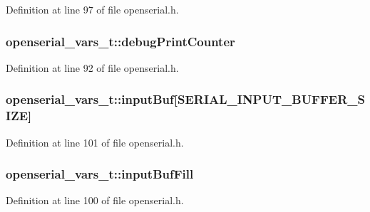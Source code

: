 Definition at line 97 of file openserial.\+h.

\subsubsection[{\texorpdfstring{debug\+Print\+Counter}{debugPrintCounter}}]{ openserial\+\_\+vars\+\_\+t\+::debug\+Print\+Counter}\hypertarget{structopenserial__vars__t_a4d8bec569e88e606f5ffbd39783a4402}{}\label{structopenserial__vars__t_a4d8bec569e88e606f5ffbd39783a4402}


Definition at line 92 of file openserial.\+h.

\subsubsection[{\texorpdfstring{input\+Buf}{inputBuf}}]{ openserial\+\_\+vars\+\_\+t\+::input\+Buf\mbox{[}{\bf S\+E\+R\+I\+A\+L\+\_\+\+I\+N\+P\+U\+T\+\_\+\+B\+U\+F\+F\+E\+R\+\_\+\+S\+I\+ZE}\mbox{]}}\hypertarget{structopenserial__vars__t_a41701302af4b1165f480d54d9ebef6d9}{}\label{structopenserial__vars__t_a41701302af4b1165f480d54d9ebef6d9}


Definition at line 101 of file openserial.\+h.

\subsubsection[{\texorpdfstring{input\+Buf\+Fill}{inputBufFill}}]{ openserial\+\_\+vars\+\_\+t\+::input\+Buf\+Fill}\hypertarget{structopenserial__vars__t_a227eee14af7a774ffd5bf46f8d667b81}{}\label{structopenserial__vars__t_a227eee14af7a774ffd5bf46f8d667b81}


Definition at line 100 of file openserial.\+h.

